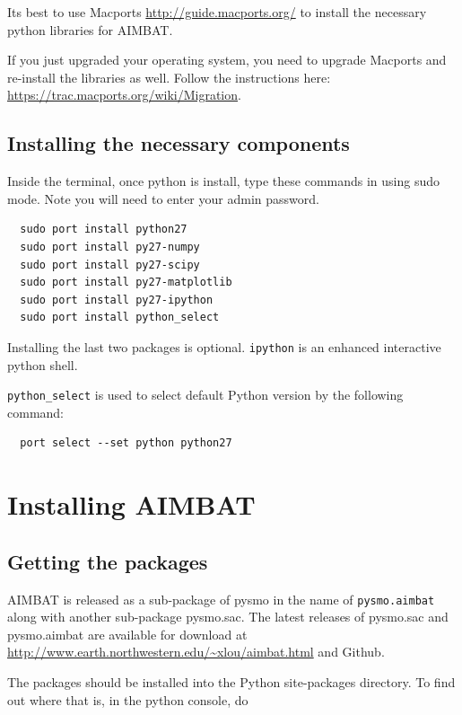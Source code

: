 \documentclass[letterpaper,10pt]{article}
\begin{document}
Its best to use Macports \url{http://guide.macports.org/} to install the necessary python libraries for AIMBAT. 

If you just upgraded your operating system, you need to upgrade Macports and re-install the libraries as well. Follow the instructions here: \url{https://trac.macports.org/wiki/Migration}.

\subsection{Installing the necessary components}

Inside the terminal, once python is install, type these commands in using sudo mode. Note you will need to enter your admin password.

\begin{verbatim}
  sudo port install python27
  sudo port install py27-numpy
  sudo port install py27-scipy
  sudo port install py27-matplotlib
  sudo port install py27-ipython
  sudo port install python_select
\end{verbatim}

Installing the last two packages is optional. \verb"ipython" is an enhanced interactive python shell.

\verb"python_select" is used to select default Python version by the following command:

\begin{verbatim}
  port select --set python python27
\end{verbatim}


\section{Installing AIMBAT}

\subsection{Getting the packages}

AIMBAT is released as a sub-package of pysmo in the name of \verb"pysmo.aimbat" along with
another sub-package pysmo.sac. The latest releases of pysmo.sac and pysmo.aimbat are
available for download at \url{http://www.earth.northwestern.edu/~xlou/aimbat.html} and Github. 

The packages should be installed into the Python site-packages directory. To find out where that is, in the python console, do
\end{document}
